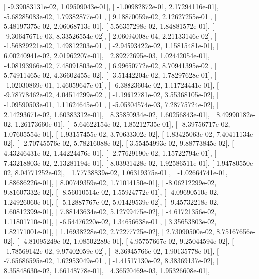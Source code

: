 \documentclass{article}
\begin{document}
       [ -9.39083131e-02,   1.09509043e-01],
       [ -1.00982872e-01,   2.17294116e-01],
       [ -5.68285083e-02,   1.79382877e-01],
       [  9.18870059e-02,   2.12627255e-01],
       [  5.48197375e-02,   2.06068713e-01],
       [  5.56357298e-02,   1.84881572e-01],
       [ -9.30647671e-03,   8.33526554e-02],
       [  2.06094008e-04,   2.21133146e-02],
       [ -1.56829221e-02,   1.49812203e-01],
       [ -2.94593422e-02,   1.15815481e-01],
       [  6.00240941e-02,   2.01962207e-01],
       [  2.89272695e-03,   1.02442054e-01],
       [ -4.08193966e-02,   7.48091803e-02],
       [  6.99650772e-02,   8.70941395e-02],
       [  5.74911465e-02,   4.36602455e-02],
       [ -3.51442204e-02,   1.78297628e-01],
       [ -1.02030869e-01,   1.46059647e-01],
       [ -6.38823604e-02,   1.11724441e-01],
       [ -9.78778462e-02,   4.04514299e-02],
       [ -1.19612781e-02,   3.55368105e-02],
       [ -1.09590503e-01,   1.11624645e-01],
       [ -5.05804574e-03,   7.28775724e-02],
       [  2.14293671e-02,   1.60383312e-01],
       [  8.35850934e-02,   1.60256843e-01],
       [  8.49990182e-02,   1.26173660e-01],
       [ -5.64622154e-02,   1.85212735e-01],
       [ -8.39756717e-02,   1.07605554e-01],
       [  1.93157455e-02,   3.70633302e-02],
       [  1.83425063e-02,   7.40411134e-02],
       [ -2.70745576e-02,   5.78216088e-02],
       [  3.55454993e-02,   9.88773845e-02],
       [  4.43246431e-02,   1.44224476e-01],
       [ -2.77629190e-02,   1.15722794e-01],
       [  7.43218803e-02,   2.13281194e-01],
       [  8.03931428e-02,   1.92586511e-01],
       [  1.94780550e-02,   8.04771252e-02],
       [  1.77738839e-02,   1.06319375e-01],
       [ -1.02664741e-01,   1.88686226e-01],
       [  8.00749359e-02,   1.71014150e-01],
       [ -8.06212299e-02,   9.81607332e-02],
       [ -8.56010514e-02,   1.55924772e-01],
       [ -4.09690510e-02,   1.24926060e-01],
       [ -5.12887767e-02,   5.01429539e-02],
       [ -9.45732218e-02,   1.60812399e-01],
       [  7.88143634e-02,   5.12799475e-02],
       [ -4.61721356e-02,   1.11801710e-01],
       [ -6.54476220e-02,   1.34656638e-01],
       [  3.35653803e-02,   1.82171001e-01],
       [  1.16938228e-02,   2.72277725e-02],
       [  2.73090500e-02,   8.75167656e-02],
       [ -4.81095249e-02,   1.08502289e-01],
       [  4.95757667e-02,   9.25044594e-02],
       [ -1.78569142e-02,   9.97402059e-02],
       [ -8.36945766e-02,   1.90135778e-01],
       [ -7.65686595e-02,   1.62953049e-01],
       [ -1.41517130e-02,   8.38369137e-02],
       [  8.35848630e-02,   1.66148778e-01],
       [  4.36520469e-03,   1.95326608e-01],
\end{document}
